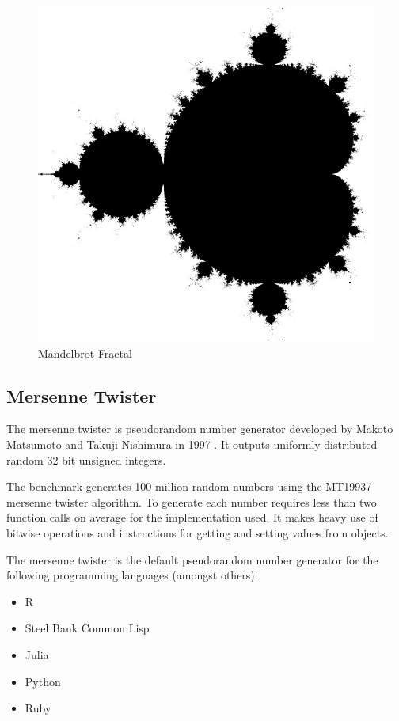 \documentclass[english,a4paper,12pt]{report}
\begin{document}
\begin{figure}
  \centering
  \includegraphics[scale=0.3]{mandelbrot.jpg}
  \caption{Mandelbrot Fractal}
  \label{fig:mandel}
\end{figure}


\subsection{Mersenne Twister}
The mersenne twister is pseudorandom number generator developed by
Makoto Matsumoto and Takuji Nishimura in 1997 \cite{Matsumoto}. It
outputs uniformly distributed random 32 bit unsigned integers.

The benchmark generates 100 million random numbers using the MT19937
mersenne twister algorithm. To generate each number requires less than
two function calls on average for the implementation used. It makes
heavy use of bitwise operations and instructions for getting and
setting values from objects.

The mersenne twister is the default pseudorandom number generator for
the following programming languages (amongst others):
\begin{itemize}
	\item R \cite{R}
	\item Steel Bank Common Lisp \cite{SBCL}
	\item Julia \cite{Julia}
	\item Python \cite{Python}
	\item Ruby \cite{Ruby}
\end{itemize}
\end{document}
